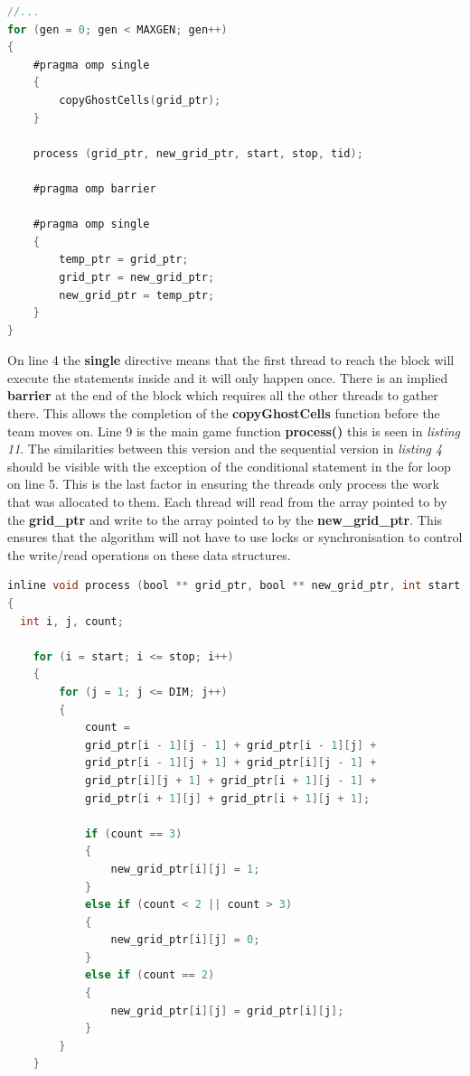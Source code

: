 \documentclass[11pt]{article} %
\begin{document}
\begin{lstlisting}[language=C, caption={OpenMP Game of Life main game loop}]
//...
for (gen = 0; gen < MAXGEN; gen++)
{
    #pragma omp single
    {
        copyGhostCells(grid_ptr);
    }
            
    process (grid_ptr, new_grid_ptr, start, stop, tid);

    #pragma omp barrier
            
    #pragma omp single
    {
        temp_ptr = grid_ptr;
        grid_ptr = new_grid_ptr;
        new_grid_ptr = temp_ptr;
    }
}
\end{lstlisting}
On line 4 the {\bf single} directive means that the first thread to reach the block will execute the statements inside and it will only happen once. There is an implied {\bf barrier} at the end of the block which requires all the other threads to gather there. This allows the completion of the {\bf copyGhostCells} function before the team moves on. Line 9 is the main game function {\bf process()} this is seen in {\it listing 11}. The similarities between this version and the sequential version in {\it listing 4} should be visible with the exception of the conditional statement in the for loop on line 5. This is the last factor in ensuring the threads only process the work that was allocated to them. Each thread will read from the array pointed to by the {\bf grid\_ptr} and write to the array pointed to by the {\bf new\_grid\_ptr}. This ensures that the algorithm will not have to use locks or synchronisation to control the write/read operations on these data structures.
\begin{lstlisting}[language=C, caption={OpenMP Process chunk and calculate moore-neighbourhood}]
inline void process (bool ** grid_ptr, bool ** new_grid_ptr, int start, int stop, int tid)
{
  int i, j, count;

    for (i = start; i <= stop; i++)
    {
        for (j = 1; j <= DIM; j++)
        {
            count =
            grid_ptr[i - 1][j - 1] + grid_ptr[i - 1][j] +
            grid_ptr[i - 1][j + 1] + grid_ptr[i][j - 1] +
            grid_ptr[i][j + 1] + grid_ptr[i + 1][j - 1] +
            grid_ptr[i + 1][j] + grid_ptr[i + 1][j + 1];

            if (count == 3)
            {
                new_grid_ptr[i][j] = 1;
            }
            else if (count < 2 || count > 3)
            {
                new_grid_ptr[i][j] = 0;
            }
            else if (count == 2)
            {
                new_grid_ptr[i][j] = grid_ptr[i][j];
            }
        }
    }
\end{lstlisting}
\end{document}
